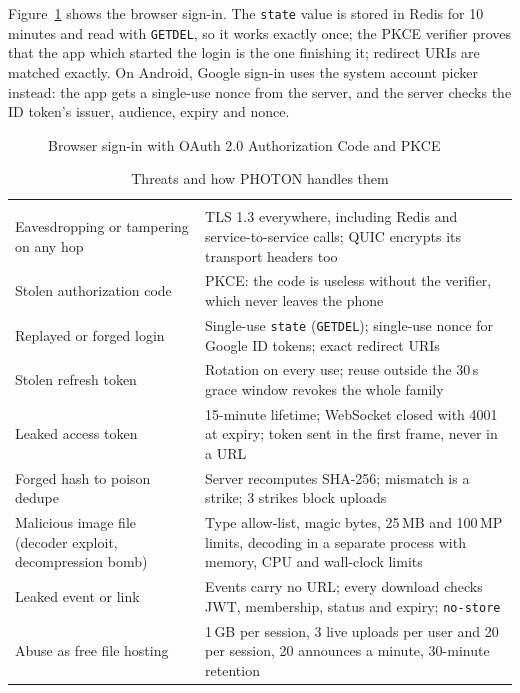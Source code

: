 Figure~\ref{fig:oauth} shows the browser sign-in. The \texttt{state} value is stored in Redis for 10 minutes and read with \texttt{GETDEL}, so it works exactly once; the PKCE verifier proves that the app which started the login is the one finishing it; redirect URIs are matched exactly. On Android, Google sign-in uses the system account picker instead: the app gets a single-use nonce from the server, and the server checks the ID token's issuer, audience, expiry and nonce.

\begin{figure}[H]
\centering
{}
\caption{Browser sign-in with OAuth 2.0 Authorization Code and PKCE}\label{fig:oauth}
\end{figure}

\begin{table}[H]
\centering
\small\stripes
\begin{tabularx}{\linewidth}{L{4.6cm}Y}
\headrow {} & \\
Eavesdropping or tampering on any hop & TLS 1.3 everywhere, including Redis and service-to-service calls; QUIC encrypts its transport headers too \\
Stolen authorization code & PKCE: the code is useless without the verifier, which never leaves the phone \\
Replayed or forged login & Single-use \texttt{state} (\texttt{GETDEL}); single-use nonce for Google ID tokens; exact redirect URIs \\
Stolen refresh token & Rotation on every use; reuse outside the 30\,s grace window revokes the whole family \\
Leaked access token & 15-minute lifetime; WebSocket closed with 4001 at expiry; token sent in the first frame, never in a URL \\
Forged hash to poison dedupe & Server recomputes SHA-256; mismatch is a strike; 3 strikes block uploads \\
Malicious image file (decoder exploit, decompression bomb) & Type allow-list, magic bytes, 25\,MB and 100\,MP limits, decoding in a separate process with memory, CPU and wall-clock limits \\
Leaked event or link & Events carry no URL; every download checks JWT, membership, status and expiry; \texttt{no-store} \\
Abuse as free file hosting & 1\,GB per session, 3 live uploads per user and 20 per session, 20 announces a minute, 30-minute retention \\
\end{tabularx}
\caption{Threats and how PHOTON handles them}\label{tab:threats}
\end{table}

